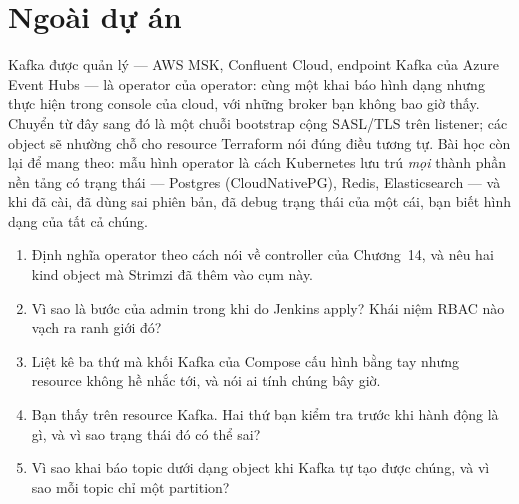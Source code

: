 \section{Ngoài dự án}

Kafka được quản lý --- AWS MSK, Confluent Cloud, endpoint Kafka của
Azure Event Hubs --- là operator của operator: cùng một khai báo hình
dạng  nhưng thực hiện trong console của cloud, với những
broker bạn không bao giờ thấy. Chuyển từ đây sang đó là một chuỗi
bootstrap cộng SASL/TLS trên listener; các object 
sẽ nhường chỗ cho resource Terraform nói đúng điều tương tự. Bài học
còn lại để mang theo: mẫu hình operator là cách Kubernetes lưu trú
\emph{mọi} thành phần nền tảng có trạng thái --- Postgres
(CloudNativePG), Redis, Elasticsearch --- và khi đã cài, đã dùng sai
phiên bản, đã debug trạng thái của một cái, bạn biết hình dạng của
tất cả chúng.

\begin{quiz}
\begin{enumerate}
  \item Định nghĩa operator theo cách nói về controller của Chương~14,
  và nêu hai kind object mà Strimzi đã thêm vào cụm này.
  \item Vì sao  là bước của admin trong khi
   do Jenkins apply? Khái niệm RBAC nào vạch ra ranh
  giới đó?
  \item Liệt kê ba thứ mà khối Kafka của Compose cấu hình bằng tay
  nhưng resource  không hề nhắc tới, và nói ai tính chúng
  bây giờ.
  \item Bạn thấy  trên resource Kafka.
  Hai thứ bạn kiểm tra trước khi hành động là gì, và vì sao trạng thái
  đó có thể sai?
  \item Vì sao khai báo topic dưới dạng object khi Kafka tự tạo được
  chúng, và vì sao mỗi topic chỉ một partition?
\end{enumerate}
\end{quiz}
